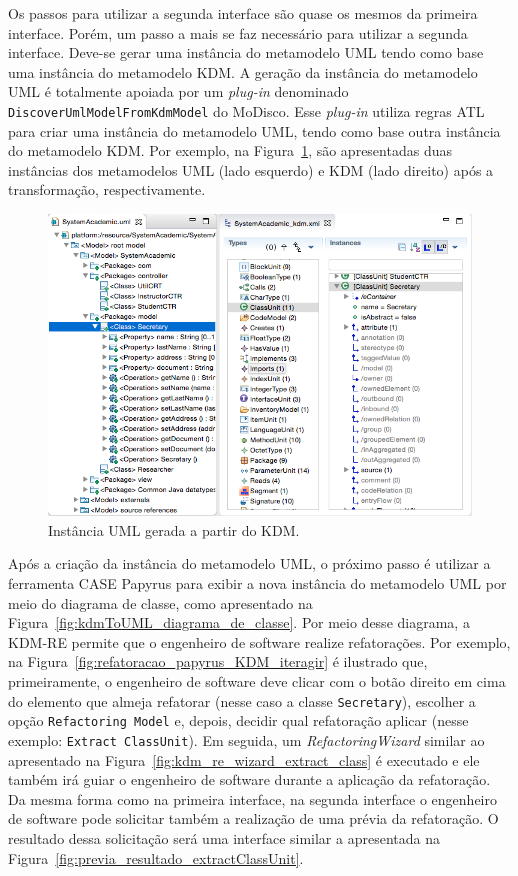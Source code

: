 Os passos para utilizar a segunda interface são quase os mesmos da primeira interface. Porém, um passo a mais se faz necessário para utilizar a segunda interface. Deve-se gerar uma instância do metamodelo UML tendo como base uma instância do metamodelo KDM. A geração da instância do metamodelo UML é totalmente apoiada por um \textit{plug-in} denominado \texttt{DiscoverUmlModelFromKdmModel} do MoDisco. Esse \textit{plug-in} utiliza regras ATL para criar uma instância do metamodelo UML, tendo como base outra instância do metamodelo KDM. Por exemplo, na Figura~\ref{fig:kdmToUML}, são apresentadas duas instâncias dos metamodelos UML (lado esquerdo) e KDM (lado direito) após a transformação, respectivamente.

\begin{figure}[!h]
	\centering
	\caption{Instância UML gerada a partir do KDM.}
	\label{fig:kdmToUML}
	\includegraphics[scale=0.5]{images/kdmToUML}
	\fautor
\end{figure}

Após a criação da instância do metamodelo UML, o próximo passo é utilizar a ferramenta CASE Papyrus para exibir a nova instância do metamodelo UML por meio do diagrama de classe, como apresentado na Figura~\ref{fig:kdmToUML_diagrama_de_classe}. Por meio desse diagrama, a KDM-RE permite que o engenheiro de software realize refatorações. Por exemplo, na Figura~\ref{fig:refatoracao_papyrus_KDM_iteragir} é ilustrado que, primeiramente, o engenheiro de software deve clicar com o botão direito em cima do elemento que almeja refatorar (nesse caso a classe \texttt{Secretary}), escolher a opção \texttt{Refactoring Model} e, depois, decidir qual refatoração aplicar (nesse exemplo: \texttt{Extract ClassUnit}). Em seguida, um \textit{RefactoringWizard} similar ao apresentado na Figura~\ref{fig:kdm_re_wizard_extract_class} é executado e ele também irá guiar o engenheiro de software durante a aplicação da refatoração. Da mesma forma como na primeira interface, na segunda interface o engenheiro de software pode solicitar também a realização de uma prévia da refatoração. O resultado dessa solicitação será uma interface similar a apresentada na Figura~\ref{fig:previa_resultado_extractClassUnit}.


